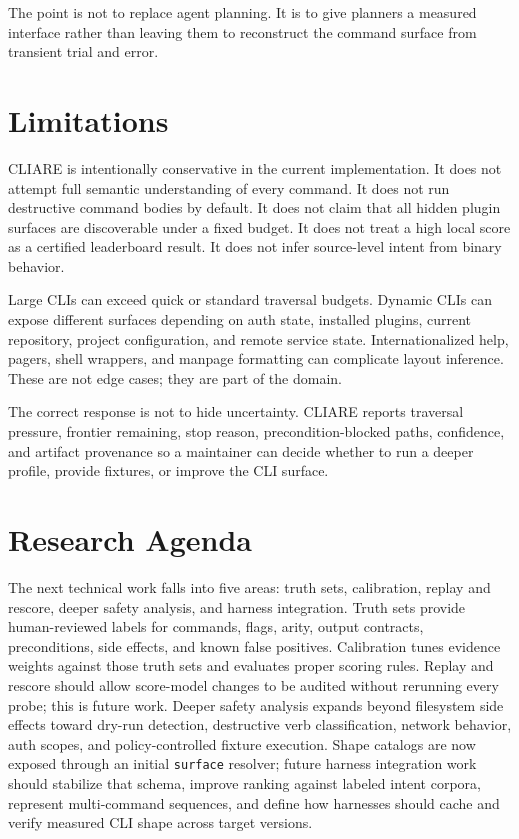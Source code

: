 \documentclass[11pt]{article}
\begin{document}
The point is not to replace agent planning. It is to give planners a measured interface rather than leaving them to reconstruct the command surface from transient trial and error.

\section{Limitations}

CLIARE is intentionally conservative in the current implementation. It does not attempt full semantic understanding of every command. It does not run destructive command bodies by default. It does not claim that all hidden plugin surfaces are discoverable under a fixed budget. It does not treat a high local score as a certified leaderboard result. It does not infer source-level intent from binary behavior.

Large CLIs can exceed quick or standard traversal budgets. Dynamic CLIs can expose different surfaces depending on auth state, installed plugins, current repository, project configuration, and remote service state. Internationalized help, pagers, shell wrappers, and manpage formatting can complicate layout inference. These are not edge cases; they are part of the domain.

The correct response is not to hide uncertainty. CLIARE reports traversal pressure, frontier remaining, stop reason, precondition-blocked paths, confidence, and artifact provenance so a maintainer can decide whether to run a deeper profile, provide fixtures, or improve the CLI surface.

\section{Research Agenda}

The next technical work falls into five areas: truth sets, calibration, replay and rescore, deeper safety analysis, and harness integration. Truth sets provide human-reviewed labels for commands, flags, arity, output contracts, preconditions, side effects, and known false positives. Calibration tunes evidence weights against those truth sets and evaluates proper scoring rules. Replay and rescore should allow score-model changes to be audited without rerunning every probe; this is future work. Deeper safety analysis expands beyond filesystem side effects toward dry-run detection, destructive verb classification, network behavior, auth scopes, and policy-controlled fixture execution. Shape catalogs are now exposed through an initial \texttt{surface} resolver; future harness integration work should stabilize that schema, improve ranking against labeled intent corpora, represent multi-command sequences, and define how harnesses should cache and verify measured CLI shape across target versions.
\end{document}
